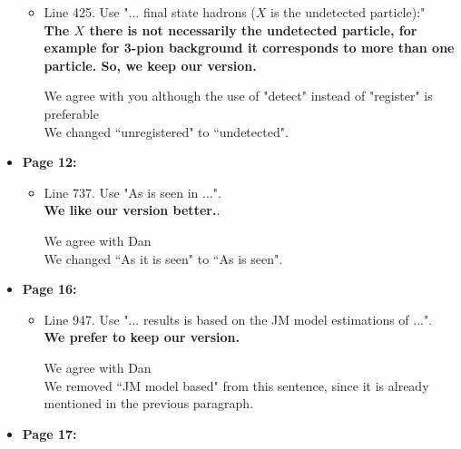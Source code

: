 \documentclass[superscriptaddress,showpacs,amssymb,amsmath,amsfonts,linenumbers,article]{revtex4-1}
\begin{document}
\begin{itemize}
\begin{itemize}
\item Line 425. Use "... final state hadrons ($X$ is the undetected particle):"\\
{\bf The $X$ there is not necessarily the undetected particle, for example for 3-pion background it corresponds to more than one particle. So, we keep our version.}

\vspace{1em}

{\color{red} We agree with you although the use of "detect" instead of "register" is preferable}\\
{\color{blue} We changed ``unregistered" to ``undetected".} 


\end{itemize}


 
\item {\bf \large  Page 12:}
\begin{itemize}


\item Line 737. Use "As is seen in ...".\\
{\bf We like our version better.}.

\vspace{1em}

{\color{red} We agree with Dan}\\ 
{\color{blue} We changed ``As it is seen" to ``As is seen".}

\end{itemize} 
 


\item {\bf \large  Page 16:}
\begin{itemize}


\item Line 947. Use "... results is based on the JM model estimations of ...".\\
{\bf We prefer to keep our version.}

\vspace{1em}

{\color{red} We agree with Dan}\\
{\color{blue} We removed ``JM model based" from this sentence, since it is already mentioned in the previous paragraph.} 


\end{itemize}  


\item {\bf \large  Page 17:}
\begin{itemize}



\end{itemize}
\end{itemize}
\end{document}
